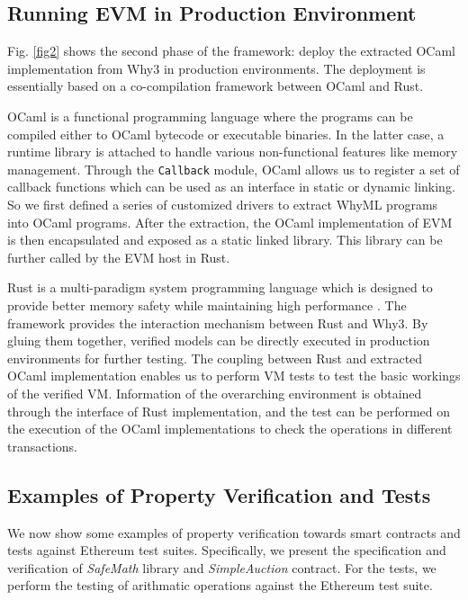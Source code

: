 \documentclass[runningheads]{llncs}
\begin{document}
\subsection{Running EVM in Production Environment}
Fig. \ref{fig2} shows the second phase of the framework: deploy the extracted OCaml implementation from Why3 in production environments. 
The deployment is essentially based on a co-compilation framework between OCaml and Rust.

OCaml is a functional programming language where the programs can be compiled either to OCaml bytecode or executable binaries. 
In the latter case, a runtime library is attached to handle various non-functional features like memory management. 
Through the \texttt{Callback} module, OCaml allows us to register a set of callback functions which can be used as an interface
in static or dynamic linking. 
So we first defined a series of customized drivers to extract WhyML programs into OCaml programs. 
After the extraction, the OCaml implementation of EVM is then encapsulated and exposed as a static linked library. 
This library can be further called by the EVM host in Rust.

Rust is a multi-paradigm system programming language which is designed to provide better memory safety 
while maintaining high performance \cite{LBHN16}.
The framework provides the interaction mechanism between Rust and Why3. 
By gluing them together, verified models can be directly executed in production environments for further testing. 
The coupling between Rust and extracted OCaml implementation enables us to perform VM tests to test the basic workings of the verified VM. 
Information of the overarching environment is obtained through the interface of Rust implementation, 
and the test can be performed on the execution of the OCaml implementations to check the operations in different transactions.    

\subsection{Examples of Property Verification and Tests}

We now show some examples of property verification towards smart contracts and tests against Ethereum 
test suites. Specifically, we present the specification and verification of \emph{SafeMath} library and \emph{SimpleAuction} contract.
For the tests, we perform the testing of arithmatic operations against the Ethereum test suite.
\end{document}
